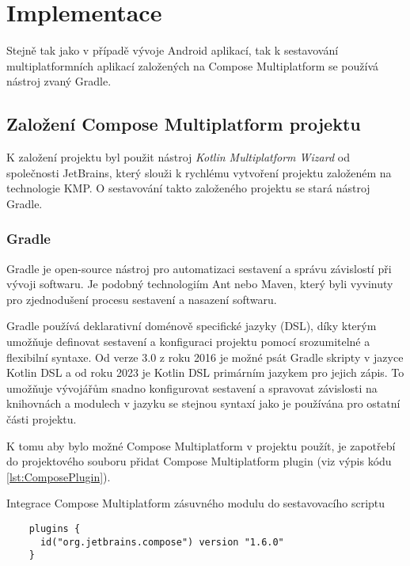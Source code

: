 \chapter{Implementace}
Stejně tak jako v případě vývoje Android aplikací, tak k sestavování multiplatformních aplikací založených na Compose Multiplatform 
se používá nástroj zvaný Gradle.  

\section{Založení Compose Multiplatform projektu}
K založení projektu byl použit nástroj \textit{Kotlin Multiplatform Wizard} od společnosti JetBrains, který slouži k rychlému vytvoření projektu
založeném na technologie KMP. O sestavování takto založeného projektu se stará nástroj Gradle.

\subsection{Gradle} \label{gradleChapter}
Gradle je open-source nástroj pro automatizaci sestavení a správu závislostí při vývoji softwaru. Je 
podobný technologiím Ant nebo Maven, který byli vyvinuty pro zjednodušení procesu sestavení a nasazení softwaru.

Gradle používá deklarativní doménově specifické jazyky (DSL), díky kterým umožňuje definovat sestavení a konfiguraci projektu pomocí srozumitelné
a flexibilní syntaxe. Od verze 3.0 z roku 2016 je možné psát Gradle skripty v jazyce Kotlin DSL a od roku 2023 je Kotlin DSL primárním jazykem 
pro jejich zápis. To umožňuje vývojářům snadno konfigurovat sestavení a spravovat závislosti na knihovnách a modulech v jazyku se stejnou
syntaxí jako je používána pro ostatní části projektu. 



K tomu aby bylo možné Compose Multiplatform v projektu použít, je zapotřebí do projektového souboru  přidat Compose 
Multiplatform plugin (viz výpis kódu \ref{lst:ComposePlugin}).

\begin{listing}
\caption{Integrace Compose Multiplatform zásuvného modulu do sestavovacího scriptu}\label{lst:ComposePlugin}
\begin{verbatim}
    plugins {
      id("org.jetbrains.compose") version "1.6.0"
    }
\end{verbatim}
\end{listing}


